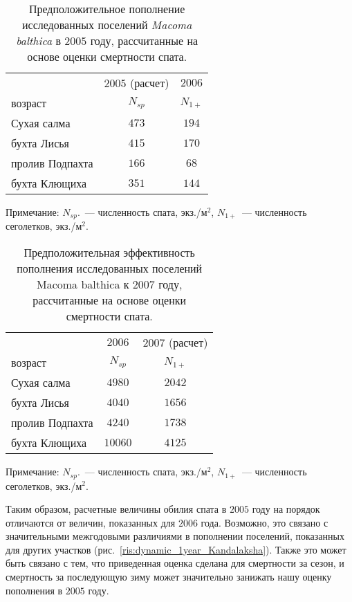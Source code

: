 \begin{table}[p]
\caption{Предположительное пополнение исследованных поселений \textit{Macoma balthica} в $2005$ году, рассчитанные на основе оценки смертности спата.}
\label{tab:spat_rasschet}
\begin{center}
\begin{tabular}{|l|c|c|}
\hline
                & $2005$ (расчет) & $2006$ \\ 
возраст         & $N_{sp}$      & $N_{1+}$  \\ \hline
Сухая салма     & $473$           & $194$  \\ \hline
бухта Лисья     & $415$           & $170$  \\ \hline
пролив Подпахта & $166$           & $68$   \\ \hline
бухта Клющиха   & $351$           & $144$  \\ \hline
\end{tabular}
\end{center}
	\footnotesize{Примечание: $N_{sp}$.~--- численность спата, экз./м$^2$, $N_{1+}$~--- численность сеголетков, экз./м$^2$.}

\end{table}


\begin{table}[p]
\caption{Предположительная эффективность пополнения исследованных поселений Macoma balthica к 2007 году, рассчитанные на основе оценки смертности спата.}
\label{tab:N1_rasschet}
\begin{center}
\begin{tabular}{|l|c|c|}
\hline
                & $2006$  & $2007$ (расчет) \\
возраст         & $N_{sp}$      & $N_{1+}$  \\ \hline
Сухая салма     & $4980$  & $2042$          \\ \hline
бухта Лисья     & $4040$  & $1656$          \\ \hline
пролив Подпахта & $4240$  & $1738$          \\ \hline
бухта Клющиха   & $10060$ & $4125$         \\ \hline
\end{tabular}
\end{center}
	\footnotesize{Примечание: $N_{sp}$.~--- численность спата, экз./м$^2$, $N_{1+}$~--- численность сеголетков, экз./м$^2$.}
\end{table}

Таким образом, расчетные величины обилия спата в $2005$ году на порядок отличаются от величин, показанных для $2006$ года. 
Возможно, это связано с значительными межгодовыми различиями в пополнении поселений, показанных для других участков (рис.~\ref{ris:dynamic_1year_Kandalaksha}). 
Также это может быть связано с тем, что приведенная оценка сделана для смертности за сезон, и смертность за последующую зиму может значительно занижать нашу оценку пополнения в $2005$ году. 

